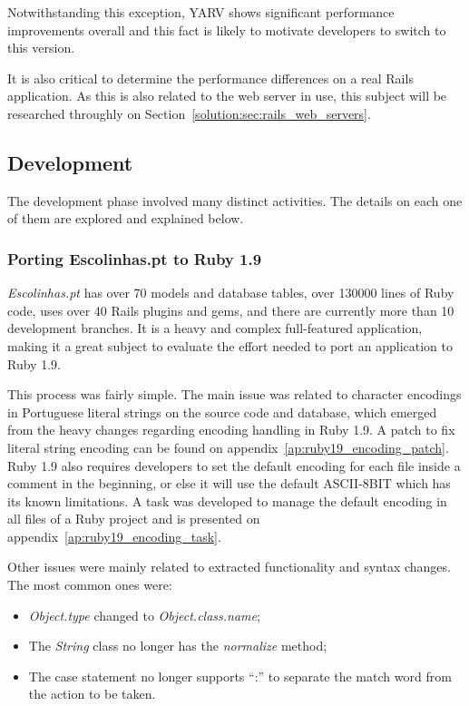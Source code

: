Notwithstanding this exception, YARV shows significant performance improvements overall and this fact is likely to motivate developers to switch to this version.

It is also critical to determine the performance differences on a real Rails application. As this is also related to the web server in use, this subject will be researched throughly on Section~\ref{solution:sec:rails_web_servers}.

\subsection{Development}
The development phase involved many distinct activities. The details on each one of them are explored and explained below.

\subsubsection{Porting Escolinhas.pt to Ruby 1.9}
\textit{Escolinhas.pt} has over 70 models and database tables, over 130000 lines of Ruby code, uses over 40 Rails plugins and gems, and there are currently more than 10 development branches. It is a heavy and complex full-featured application, making it a great subject to evaluate the effort needed to port an application to Ruby 1.9.

This process was fairly simple. The main issue was related to character encodings in Portuguese literal strings on the source code and database, which emerged from the heavy changes regarding encoding handling in Ruby 1.9. A patch to fix literal string encoding can be found on appendix~\ref{ap:ruby19_encoding_patch}. Ruby 1.9 also requires developers to set the default encoding for each file inside a comment in the beginning, or else it will use the default ASCII-8BIT which has its known limitations. A task was developed to manage the default encoding in all files of a Ruby project and is presented on appendix~\ref{ap:ruby19_encoding_task}.

Other issues were mainly related to extracted functionality and syntax changes. The most common ones were:
\begin{itemize}
  \item \textit{Object.type} changed to \textit{Object.class.name};
  \item The \textit{String} class no longer has the \textit{normalize} method;
  \item The case statement no longer supports ``:'' to separate the match word from the action to be taken.
\end{itemize}

